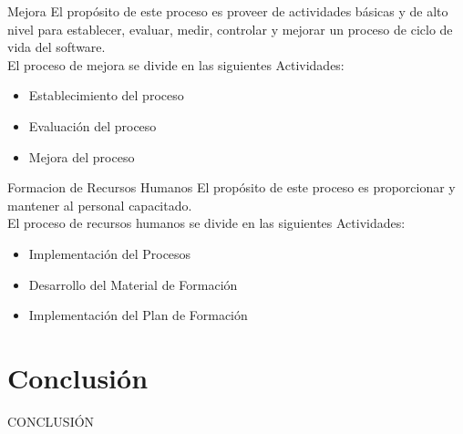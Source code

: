 \documentclass{beamer}
\begin{document}
			\begin{frame}{Mejora}
				El propósito de este proceso es proveer de actividades básicas y de alto nivel para establecer, evaluar, medir, controlar y mejorar un proceso de ciclo de vida del software.\\
				
				El proceso de mejora se divide en las siguientes Actividades:\pause
				\begin{itemize}
					\item Establecimiento del proceso\pause
					\item Evaluación del proceso\pause
					\item Mejora del proceso
				\end{itemize}
			\end{frame}
			
			\begin{frame}{Formacion de Recursos Humanos}
				El propósito de este proceso es proporcionar y mantener al personal capacitado.\\
				
				El proceso de recursos humanos se divide en las siguientes Actividades:\pause
				\begin{itemize}
					\item Implementación del Procesos\pause
					\item Desarrollo del Material de Formación\pause
					\item Implementación del Plan de Formación 
				\end{itemize} 
			\end{frame}
			
			
			
			
			\section{Conclusi\'on}
				\begin{frame}{}%
					\begin{center}
					\begin{block}{}
						\begin{center}
							{\huge CONCLUSIÓN}
						\end{center}
					\end{block}
				\end{center}
				\end{frame}				
			
\end{document}
